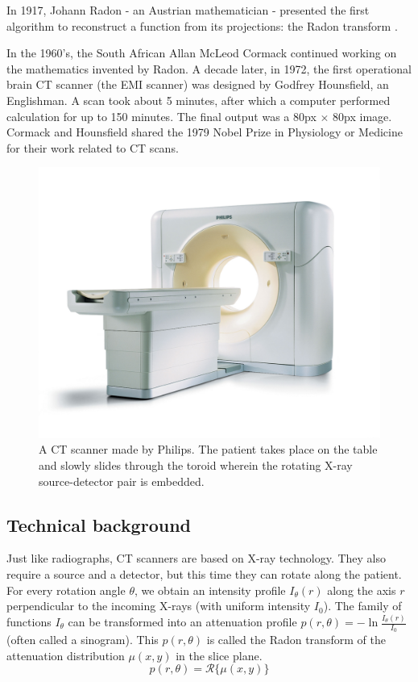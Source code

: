 In 1917, Johann Radon - an Austrian mathematician - presented the first
algorithm to reconstruct a function from its projections: the Radon transform
\cite{radon}.

In the 1960's, the South African Allan McLeod Cormack continued working on the
mathematics invented by Radon. A decade later, in 1972, the first operational
brain CT scanner (the EMI scanner) was designed by Godfrey Hounsfield, an
Englishman. A scan took about 5 minutes, after which a computer performed
calculation for up to 150 minutes. The final output was a 80px $\times$ 80px
image. Cormack and Hounsfield shared the 1979 Nobel Prize in Physiology or
Medicine for their work related to CT scans.


\begin{figure}[ht]
\begin{center}
  \includegraphics[width=\linewidth]{img/ctscanner.jpg}
  \caption{A CT scanner made by Philips. The patient takes place on the table
  and slowly slides through the toroid wherein the rotating X-ray
  source-detector pair is embedded.}
  \label{fig:ctscanner}
\end{center}
\end{figure}

\subsection{Technical background}
Just like radiographs, CT scanners are based on X-ray technology. They also
require a source and a detector, but this time they can rotate along the
patient. For every rotation angle $\theta$, we obtain an intensity profile
$I_\theta(r)$ along the axis $r$ perpendicular to the incoming X-rays (with
uniform intensity $I_0$). The family of functions $I_\theta$ can be transformed
into an attenuation profile $p(r, \theta) = -\ln \tfrac{I_\theta(r)}{I_0}$
(often called a sinogram). This $p(r, \theta)$ is called the Radon transform of
the attenuation distribution $\mu(x,y)$ in the slice plane.
\begin{equation}
	p(r, \theta) = \mathscr{R}\{ \mu(x,y) \}
\end{equation}

